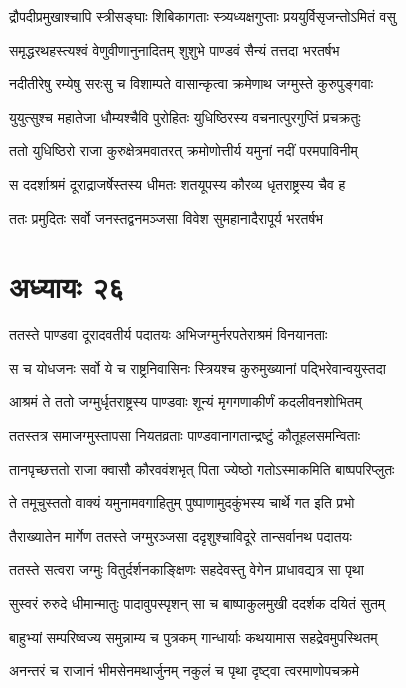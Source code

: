 \twolineshloka
{द्रौपदीप्रमुखाश्चापि स्त्रीसङ्घाः शिबिकागताः}
{स्त्र्यध्यक्षगुप्ताः प्रययुर्विसृजन्तोऽमितं वसु}


\twolineshloka
{समृद्धरथहस्त्यश्वं वेणुवीणानुनादितम्}
{शुशुभे पाण्डवं सैन्यं तत्तदा भरतर्षभ}


\twolineshloka
{नदीतीरेषु रम्येषु सरःसु च विशाम्पते}
{वासान्कृत्वा क्रमेणाथ जग्मुस्ते कुरुपुङ्गवाः}


\twolineshloka
{युयुत्सुश्च महातेजा धौम्यश्चैवि पुरोहितः}
{युधिष्ठिरस्य वचनात्पुरगुप्तिं प्रचक्रतुः}


\twolineshloka
{ततो युधिष्ठिरो राजा कुरुक्षेत्रमवातरत्}
{क्रमोणोत्तीर्य यमुनां नदीं परमपाविनीम्}


\twolineshloka
{स ददर्शाश्रमं दूराद्राजर्षेस्तस्य धीमतः}
{शतयूपस्य कौरव्य धृतराष्ट्रस्य चैव ह}


\twolineshloka
{ततः प्रमुदितः सर्वो जनस्तद्वनमञ्जसा}
{विवेश सुमहानादैरापूर्य भरतर्षभ}


\chapter{अध्यायः २६}
\twolineshloka
{ततस्ते पाण्डवा दूरादवतीर्य पदातयः}
{अभिजग्मुर्नरपतेराश्रमं विनयानताः}


\twolineshloka
{स च योधजनः सर्वो ये च राष्ट्रनिवासिनः}
{स्त्रियश्च कुरुमुख्यानां पद्भिरेवान्वयुस्तदा}


\twolineshloka
{आश्रमं ते ततो जग्मुर्धृतराष्ट्रस्य पाण्डवाः}
{शून्यं मृगगणाकीर्णं कदलीवनशोभितम्}


\twolineshloka
{ततस्तत्र समाजग्मुस्तापसा नियतव्रताः}
{पाण्डवानागतान्द्रष्टुं कौतूहलसमन्विताः}


\twolineshloka
{तानपृच्छत्ततो राजा क्वासौ कौरववंशभृत्}
{पिता ज्येष्ठो गतोऽस्माकमिति बाष्पपरिप्लुतः}


\twolineshloka
{ते तमूचुस्ततो वाक्यं यमुनामवगाहितुम्}
{पुष्पाणामुदकुंभस्य चार्थे गत इति प्रभो}


\twolineshloka
{तैराख्यातेन मार्गेण ततस्ते जग्मुरञ्जसा}
{ददृशुश्चाविदूरे तान्सर्वानथ पदातयः}


\twolineshloka
{ततस्ते सत्वरा जग्मुः वितुर्दर्शनकाङ्क्षिणः}
{सहदेवस्तु वेगेन प्राधावद्यत्र सा पृथा}


\twolineshloka
{सुस्वरं रुरुदे धीमान्मातुः पादावुपस्पृशन्}
{सा च बाष्पाकुलमुखी ददर्शक दयितं सुतम्}


\twolineshloka
{बाहुभ्यां सम्परिष्वज्य समुन्नाम्य च पुत्रकम्}
{गान्धार्याः कथयामास सहद्रेवमुपस्थितम्}


\twolineshloka
{अनन्तरं च राजानं भीमसेनमथार्जुनम्}
{नकुलं च पृथा दृष्ट्वा त्वरमाणोपचक्रमे}


